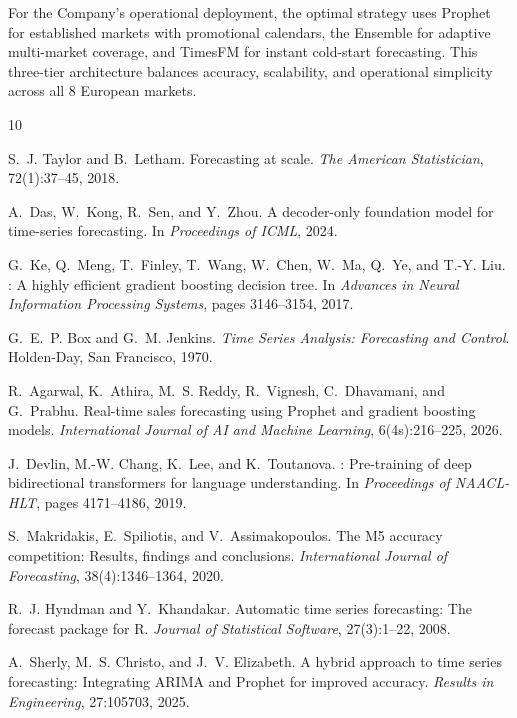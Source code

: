 \documentclass[10pt,twocolumn,a4paper]{article}
\begin{document}
For the Company's operational deployment, the optimal strategy uses Prophet for established markets with promotional calendars, the Ensemble for adaptive multi-market coverage, and TimesFM for instant cold-start forecasting. This three-tier architecture balances accuracy, scalability, and operational simplicity across all 8 European markets.



\begin{thebibliography}{10}

S.~J. Taylor and B.~Letham.
\newblock Forecasting at scale.
\newblock \emph{The American Statistician}, 72(1):37--45, 2018.

A.~Das, W.~Kong, R.~Sen, and Y.~Zhou.
\newblock A decoder-only foundation model for time-series forecasting.
\newblock In \emph{Proceedings of ICML}, 2024.

G.~Ke, Q.~Meng, T.~Finley, T.~Wang, W.~Chen, W.~Ma, Q.~Ye, and T.-Y. Liu.
: A highly efficient gradient boosting decision tree.
\newblock In \emph{Advances in Neural Information Processing Systems}, pages 3146--3154, 2017.

G.~E.~P. Box and G.~M. Jenkins.
\newblock \emph{Time Series Analysis: Forecasting and Control}.
\newblock Holden-Day, San Francisco, 1970.

R.~Agarwal, K.~Athira, M.~S. Reddy, R.~Vignesh, C.~Dhavamani, and G.~Prabhu.
\newblock Real-time sales forecasting using {P}rophet and gradient boosting models.
\newblock \emph{International Journal of AI and Machine Learning}, 6(4s):216--225, 2026.

J.~Devlin, M.-W. Chang, K.~Lee, and K.~Toutanova.
: Pre-training of deep bidirectional transformers for language understanding.
\newblock In \emph{Proceedings of NAACL-HLT}, pages 4171--4186, 2019.

S.~Makridakis, E.~Spiliotis, and V.~Assimakopoulos.
\newblock The {M5} accuracy competition: Results, findings and conclusions.
\newblock \emph{International Journal of Forecasting}, 38(4):1346--1364, 2020.

R.~J. Hyndman and Y.~Khandakar.
\newblock Automatic time series forecasting: The forecast package for {R}.
\newblock \emph{Journal of Statistical Software}, 27(3):1--22, 2008.

A.~Sherly, M.~S. Christo, and J.~V. Elizabeth.
\newblock A hybrid approach to time series forecasting: Integrating {ARIMA} and {P}rophet for improved accuracy.
\newblock \emph{Results in Engineering}, 27:105703, 2025.

\end{thebibliography}
\end{document}
